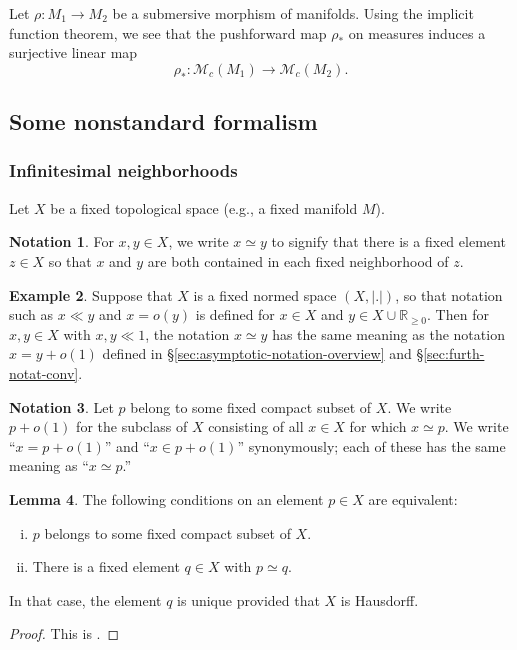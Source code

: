 \documentclass[reqno]{amsart}
\theoremstyle{plain} \newtheorem{theorem} {Theorem}
\theoremstyle{definition} \newtheorem{definition} [theorem] {Definition}
\newtheorem{example} [theorem] {Example}
\newtheorem{notation} [theorem]        {Notation}
\theoremstyle{itplain} %
\newtheorem{lemma}[theorem]{Lemma}
\numberwithin{equation}{section}
\numberwithin{theorem}{section}
\renewcommand{\geq}{\geqslant}
\begin{document}
Let $\rho : M_1 \rightarrow M_2$ be a submersive morphism of manifolds.  Using the implicit function theorem, we see that the pushforward map $\rho_*$ on measures induces a surjective linear map
\begin{equation*}
  \rho_* : \mathcal{M}_c(M_1) \rightarrow \mathcal{M}_c(M_2).
\end{equation*}


\subsection{Some nonstandard formalism}

\subsubsection{Infinitesimal neighborhoods}
Let $X$ be a fixed topological space (e.g., a fixed manifold $M$).
\begin{notation}
  For $x,y \in X$, we write $x \simeq y$ to signify that there is a fixed element $z \in X$ so that $x$ and $y$ are both contained in each fixed neighborhood of $z$.
\end{notation}
\begin{example}
  Suppose that $X$ is a fixed normed space $(X,|.|)$, so that notation such as $x \ll y$ and $x = o(y)$ is defined for $x \in X$ and $y \in X \cup \mathbb{R}_{\geq 0}$.  Then for $x,y \in X$ with $x,y \ll 1$, the notation $x \simeq y$ has the same meaning as the notation $x = y + o(1)$ defined in \S\ref{sec:asymptotic-notation-overview} and \S\ref{sec:furth-notat-conv}.
\end{example}

\begin{notation}
  Let $p$ belong to some fixed compact subset of $X$.  We write $p + o(1)$ for the subclass of $X$ consisting of all $x \in X$ for which $x \simeq p$.  We write ``$x = p + o(1)$'' and ``$x \in p + o(1)$'' synonymously; each of these has the same meaning as ``$x \simeq p$.''
\end{notation}

\begin{lemma}
  The following conditions on an element $p \in X$ are equivalent:
  \begin{enumerate}[(i)]
  \item $p$ belongs to some fixed compact subset of $X$.
  \item There is a fixed element $q \in X$ with $p \simeq q$.
  \end{enumerate}
  In that case, the element $q$ is unique provided that $X$ is Hausdorff.
\end{lemma}
\begin{proof}
  This is \cite[Thm 6.1]{MR469763}.
\end{proof}
\end{document}
